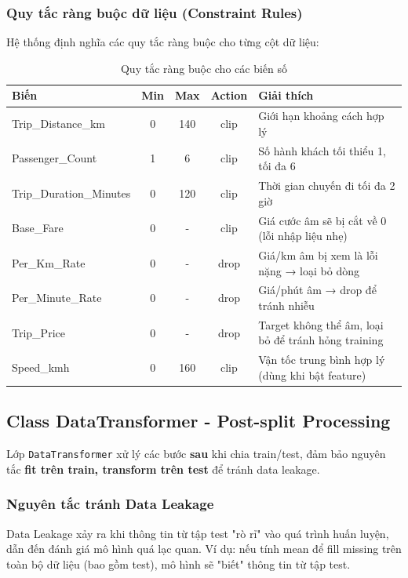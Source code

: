 \documentclass[12pt,a4paper]{article}
\begin{document}
\subsubsection{Quy tắc ràng buộc dữ liệu (Constraint Rules)}

Hệ thống định nghĩa các quy tắc ràng buộc cho từng cột dữ liệu:

\begin{table}[H]
\centering
\caption{Quy tắc ràng buộc cho các biến số}
\label{tab:constraint_rules}
\begin{tabular}{|l|c|c|c|p{4cm}|}
\hline
\textbf{Biến} & \textbf{Min} & \textbf{Max} & \textbf{Action} & \textbf{Giải thích} \\
\hline
Trip\_Distance\_km & 0 & 140 & clip & Giới hạn khoảng cách hợp lý \\
\hline
Passenger\_Count & 1 & 6 & clip & Số hành khách tối thiểu 1, tối đa 6 \\
\hline
Trip\_Duration\_Minutes & 0 & 120 & clip & Thời gian chuyến đi tối đa 2 giờ \\
\hline
Base\_Fare & 0 & - & clip & Giá cước âm sẽ bị cắt về 0 (lỗi nhập liệu nhẹ) \\
\hline
Per\_Km\_Rate & 0 & - & drop & Giá/km âm bị xem là lỗi nặng → loại bỏ dòng \\
\hline
Per\_Minute\_Rate & 0 & - & drop & Giá/phút âm → drop để tránh nhiễu \\
\hline
Trip\_Price & 0 & - & drop & Target không thể âm, loại bỏ để tránh hỏng training \\
\hline
Speed\_kmh & 0 & 160 & clip & Vận tốc trung bình hợp lý (dùng khi bật feature) \\
\hline
\end{tabular}
\end{table}

\subsection{Class DataTransformer - Post-split Processing}

Lớp \texttt{DataTransformer} xử lý các bước \textbf{sau} khi chia train/test, đảm bảo nguyên tắc \textbf{fit trên train, transform trên test} để tránh data leakage.

\subsubsection{Nguyên tắc tránh Data Leakage}

\begin{definitionbox}
Data Leakage xảy ra khi thông tin từ tập test "rò rỉ" vào quá trình huấn luyện, dẫn đến đánh giá mô hình quá lạc quan. Ví dụ: nếu tính mean để fill missing trên toàn bộ dữ liệu (bao gồm test), mô hình sẽ "biết" thông tin từ tập test.
\end{definitionbox}
\end{document}
